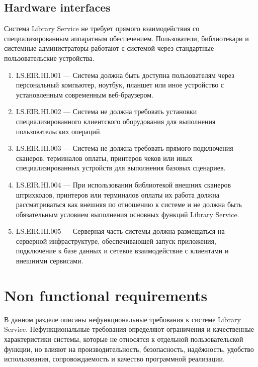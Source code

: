 \documentclass[12pt,a4paper]{article}
\begin{document}
	\subsection{Hardware interfaces}
	
	Система Library Service не требует прямого взаимодействия со специализированным
	аппаратным обеспечением. Пользователи, библиотекари и системные администраторы
	работают с системой через стандартные пользовательские устройства.
	
	\begin{enumerate}
		\item LS.EIR.HI.001 --- Система должна быть доступна пользователям через
		персональный компьютер, ноутбук, планшет или иное устройство с установленным
		современным веб-браузером.
		
		\item LS.EIR.HI.002 --- Система не должна требовать установки специализированного
		клиентского оборудования для выполнения пользовательских операций.
		
		\item LS.EIR.HI.003 --- Система не должна требовать прямого подключения
		сканеров, терминалов оплаты, принтеров чеков или иных специализированных
		устройств для выполнения базовых сценариев.
		
		\item LS.EIR.HI.004 --- При использовании библиотекой внешних сканеров штрихкодов,
		принтеров или терминалов оплаты их работа должна рассматриваться как внешняя
		по отношению к системе и не должна быть обязательным условием выполнения
		основных функций Library Service.
		
		\item LS.EIR.HI.005 --- Серверная часть системы должна размещаться на серверной
		инфраструктуре, обеспечивающей запуск приложения, подключение к базе данных
		и сетевое взаимодействие с клиентами и внешними сервисами.
	\end{enumerate}
	
	\section{Non functional requirements}
	
	В данном разделе описаны нефункциональные требования к системе Library Service.
	Нефункциональные требования определяют ограничения и качественные характеристики
	системы, которые не относятся к отдельной пользовательской функции, но влияют
	на производительность, безопасность, надёжность, удобство использования,
	сопровождаемость и качество программной реализации.
	
\end{document}
